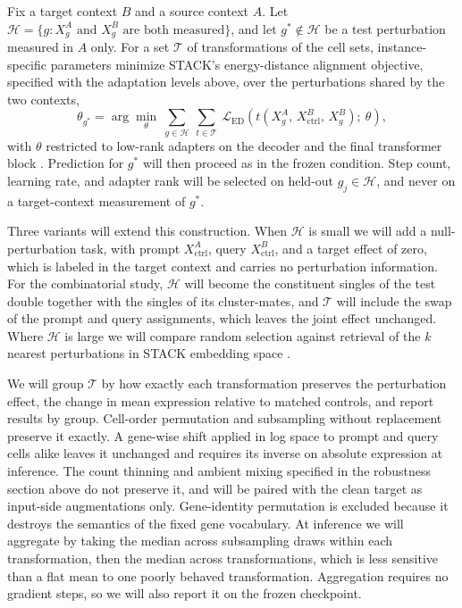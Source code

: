 \documentclass[times, twoside, watermark]{zHenriquesLab-StyleBioRxiv}
\begin{document}
Fix a target context $B$ and a source context $A$. Let $\mathcal{H} = \{g : X^{A}_{g} \text{ and } X^{B}_{g} \text{ are both measured}\}$, and let $g^{*} \notin \mathcal{H}$ be a test perturbation measured in $A$ only. For a set $\mathcal{T}$ of transformations of the cell sets, instance-specific parameters minimize STACK's energy-distance alignment objective, specified with the adaptation levels above, over the perturbations shared by the two contexts,
\begin{equation}
\theta_{g^{*}} = \arg\min_{\theta}\ \sum_{g \in \mathcal{H}}\ \sum_{t \in \mathcal{T}}\ \mathcal{L}_{\mathrm{ED}}\!\left(t\!\left(X^{A}_{g},\, X^{B}_{\mathrm{ctrl}},\, X^{B}_{g}\right);\ \theta\right),
\label{eq:ttt}
\end{equation}
with $\theta$ restricted to low-rank adapters on the decoder and the final transformer block \cite{hu2022lora}. Prediction for $g^{*}$ will then proceed as in the frozen condition. Step count, learning rate, and adapter rank will be selected on held-out $g_j \in \mathcal{H}$, and never on a target-context measurement of $g^{*}$.
 
Three variants will extend this construction. When $\mathcal{H}$ is small we will add a null-perturbation task, with prompt $X^{A}_{\mathrm{ctrl}}$, query $X^{B}_{\mathrm{ctrl}}$, and a target effect of zero, which is labeled in the target context and carries no perturbation information. For the combinatorial study, $\mathcal{H}$ will become the constituent singles of the test double together with the singles of its cluster-mates, and $\mathcal{T}$ will include the swap of the prompt and query assignments, which leaves the joint effect unchanged. Where $\mathcal{H}$ is large we will compare random selection against retrieval of the $k$ nearest perturbations in STACK embedding space \cite{hardt2024nearest}.
 
We will group $\mathcal{T}$ by how exactly each transformation preserves the perturbation effect, the change in mean expression relative to matched controls, and report results by group. Cell-order permutation and subsampling without replacement preserve it exactly. A gene-wise shift applied in log space to prompt and query cells alike leaves it unchanged and requires its inverse on absolute expression at inference. The count thinning and ambient mixing specified in the robustness section above do not preserve it, and will be paired with the clean target as input-side augmentations only. Gene-identity permutation is excluded because it destroys the semantics of the fixed gene vocabulary. At inference we will aggregate by taking the median across subsampling draws within each transformation, then the median across transformations, which is less sensitive than a flat mean to one poorly behaved transformation. Aggregation requires no gradient steps, so we will also report it on the frozen checkpoint.
 
\end{document}

